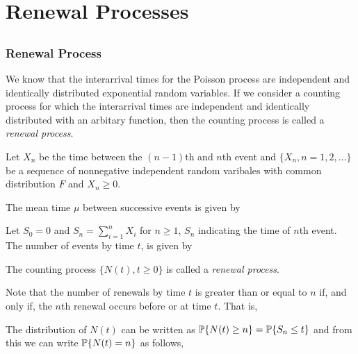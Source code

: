 \documentclass[all-lectures.tex]{subfiles}
\author{}
\begin{document}
\setcounter{chapter}{1}
\chapter{Renewal Processes}

\setcounter{section}{1}
\section*{}
\subsection{Renewal Process}
We know that the interarrival times for the Poisson process are independent and identically distributed exponential random variables.
If we consider a counting process for which the interarrival times are independent and identically distributed with an arbitary function, then the counting process is called a \textit{renewal process}.

Let $X_n$ be the time between the $(n-1)$th and $n$th event and $\{X_n,n=1,2,\dots\}$ be a sequence of nonnegative independent random varibales with common distribution $F$ and $X_n \ge 0$.

The mean time $\mu$ between successive events is given by


Let $S_0=0$ and $S_n = \sum_{i=1}^{n} X_i$ for $n \ge 1$, $S_n$ indicating the time of $n$th event.
The number of events by time $t$, is given by

\begin{defn}
The counting process $\{ N(t),t \ge 0\}$ is called a \textit{renewal process}.
\end{defn}

Note that the number of renewals by time $t$ is greater than or equal to $n$ if, and only if, the $n$th renewal occurs before or at time $t$.
That is,

The distribution of $N(t)$ can be written as $\P\{N(t) \ge n\} = \P\{S_n \le t\}$ and from this we can write $\P\{N(t)=n\}$ as follows,
\end{document}
